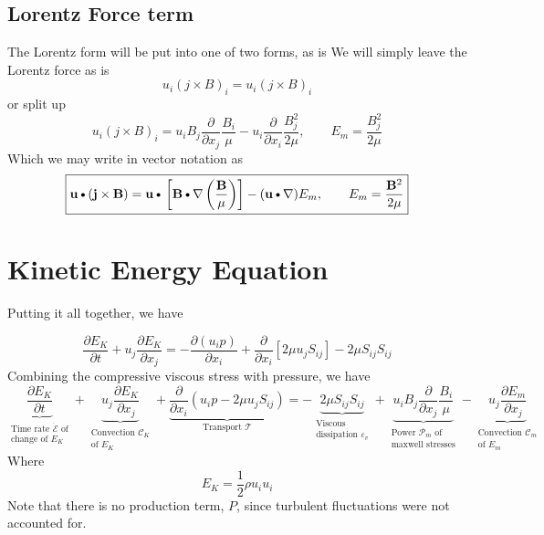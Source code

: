 \documentclass[11pt]{article}
\newcommand{\B}{\mathbf{B}}
\newcommand{\PD}{\partial}
\newcommand{\MC}{\mathcal}
\newcommand{\BM}{\frac{\mathbf{B}}{\mu}}
\newcommand{\J}{\mathbf{j}}
\renewcommand{\U}{\mathbf{u}}
\newcommand{\DOT}{\text{\textbullet}}
\begin{document}
\subsection{Lorentz Force term}
The Lorentz form will be put into one of two forms, as is
We will simply leave the Lorentz force as is
\begin{equation}
	\boxed{
	u_i (j \times B)_i = u_i (j \times B)_i
	}
\end{equation}
or split up
\begin{equation}
	\boxed{
	u_i (j \times B)_i
	= u_i B_j \frac{\PD}{\PD x_j} \frac{B_i}{\mu} - u_i \frac{\PD}{\PD x_i} \frac{B_j^2}{2 \mu}
	, \qquad E_m = \frac{B_j^2}{2 \mu}
	}
\end{equation}
Which we may write in vector notation as
\begin{equation}
	\boxed{
	\U \DOT (\J \times \B) = \U \DOT \left[\B \DOT \nabla \left( \BM \right) \right] - (\U \DOT \nabla) E_m
	,\qquad
	E_m = \frac{\B^2}{2 \mu}
	}
\end{equation}

\section{Kinetic Energy Equation}
Putting it all together, we have

\begin{equation}
	\frac{\PD E_K}{\PD t} +
	u_j \frac{\PD E_K}{\PD x_j} =
	- \frac{\PD (u_i p)}{\PD x_i} +
	\frac{\PD}{\PD x_i} \left[ 2 \mu u_j S_{ij} \right] -
	2 \mu S_{ij} S_{ij}
\end{equation}
Combining the compressive viscous stress with pressure, we have
\begin{equation}
	\boxed{
	\underbrace{\frac{\PD E_K}{\PD t}}_{\substack{\text{Time rate $\dot{\MC E}$ of} \\ \text{change of $E_K$}}} +
	\underbrace{u_j \frac{\PD E_K}{\PD x_j}}_
	{\substack{\text{Convection } \MC C_K \\\text{of $E_K$}}}
	+ \underbrace{\frac{\PD}{\PD x_i} \left( u_i p - 2 \mu u_j S_{ij} \right)}_{\text{Transport } \MC T} =
	- \underbrace{2 \mu S_{ij} S_{ij}}_{\substack{\text{Viscous } \\ \text{dissipation } \varepsilon_v}}
	+ \underbrace{u_i B_j \frac{\PD}{\PD x_j} \frac{B_i}{\mu}}_
	{\substack{\text{Power $\MC P_{m}$ of}\\\text{maxwell stresses}}}
	- \underbrace{u_j \frac{\PD E_m}{\PD x_j}}_
	{\substack{\text{Convection $\MC C_m$}\\\text{of $E_m$}}}
	}
\end{equation}
Where
\begin{equation}
	E_K = \frac{1}{2} \rho u_i u_i
\end{equation}
Note that there is no production term, $P$, since turbulent fluctuations were not accounted for.
\end{document}
